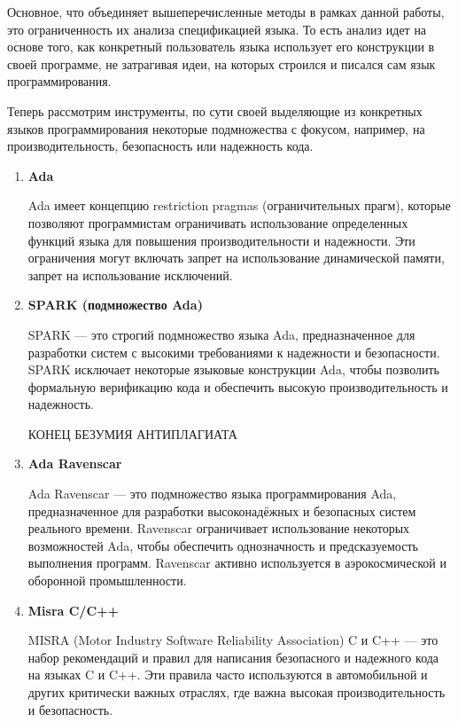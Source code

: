 \documentclass{mipt-thesis-bs}
\begin{document}
Основное, что объединяет вышеперечисленные методы в рамках данной работы, это ограниченность их
анализа спецификацией языка. То есть анализ идет на основе того, как конкретный пользователь
языка использует его конструкции в своей программе, не затрагивая идеи, на которых строился
и писался сам язык программирования.

Теперь рассмотрим инструменты, по сути своей выделяющие из конкретных языков программирования
некоторые подмножества с фокусом, например, на производительность, безопасность или надежность кода.

\begin{enumerate}
        \item \textbf{Ada}

        Ada имеет концепцию restriction pragmas (ограничительных прагм), которые позволяют
        программистам ограничивать использование определенных функций языка для повышения
        производительности и надежности. Эти ограничения могут включать запрет на использование
        динамической памяти, запрет на использование исключений.

        \item \textbf{SPARK (подмножество Ada)}

        SPARK — это строгий подмножество языка Ada, предназначенное для разработки
        систем с высокими требованиями к надежности и безопасности. SPARK исключает некоторые
        языковые конструкции Ada, чтобы позволить формальную верификацию кода и
        обеспечить высокую производительность и надежность.


        КОНЕЦ БЕЗУМИЯ АНТИПЛАГИАТА

        \item \textbf{Ada Ravenscar}

        Ada Ravenscar — это подмножество языка программирования Ada, предназначенное для
        разработки высоконадёжных и безопасных систем реального времени. Ravenscar ограничивает
        использование некоторых возможностей Ada, чтобы обеспечить однозначность и
        предсказуемость выполнения программ. Ravenscar активно используется в аэрокосмической и оборонной промышленности.

        \item \textbf{Misra C/C++}

        MISRA (Motor Industry Software Reliability Association) C и C++ — это набор
        рекомендаций и правил для написания безопасного и надежного кода на
        языках C и C++. Эти правила часто используются в автомобильной и
        других критически важных отраслях, где важна высокая производительность и безопасность.


\end{enumerate}
\end{document}
